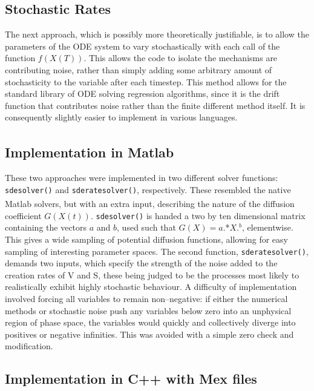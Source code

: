 \documentclass[a4paper, 12pt]{report}
\begin{document}
\subsection{Stochastic Rates}

The next approach, which is possibly more theoretically justifiable, is to allow the parameters of the ODE system to vary stochastically with each call of the function $f(X(T))$. This allows the code to isolate the mechanisms are contributing noise, rather than simply adding some arbitrary amount of stochasticity to the variable after each timestep. This method allows for the standard library of ODE solving regression algorithms, since it is the drift function that contributes noise rather than the finite different method itself. It is consequently slightly easier to implement in various languages.

\subsection{Implementation in Matlab\textsuperscript{\textregistered}}

These two approaches were implemented in two different solver functions: \texttt{sdesolver()} and \texttt{sderatesolver()}, respectively. These resembled the native Matlab\textsuperscript{\textregistered} solvers, but with an extra input, describing the nature of the diffusion coefficient $G(X(t))$. \texttt{sdesolver()} is handed a two by ten dimensional matrix containing the vectors $a$ and $b$, used such that $G(X)=a.$*$X.^b$, elementwise. This gives a wide sampling of potential diffusion functions, allowing for easy sampling of interesting parameter spaces. The second function, \texttt{sderatesolver()}, demands two inputs, which specify the strength of the noise added to the creation rates of V and S, these being judged to be the processes most likely to realistically exhibit highly stochastic behaviour. A difficulty of implementation involved forcing all variables to remain non--negative: if either the numerical methods or stochastic noise push any variables below zero into an unphysical region of phase space, the variables would quickly and collectively diverge into positives or negative infinities. This was avoided with a simple zero check and modification.

\subsection{Implementation in C++ with Mex files}
\end{document}
